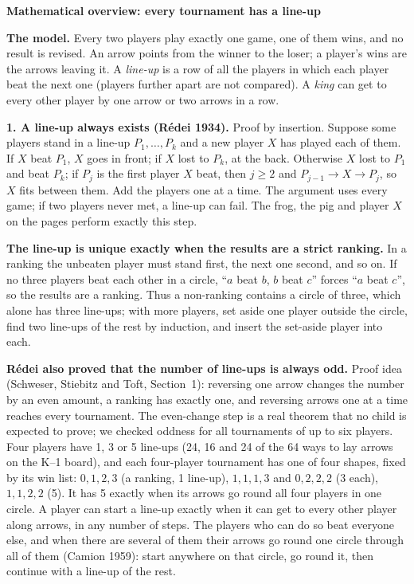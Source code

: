 \documentclass[11pt]{article}
\newcommand{\head}[1]{\par\needspace{6\baselineskip}\vspace{2pt}\textbf{\large #1}\par}
\begin{document}
\head{Mathematical overview: every tournament has a line-up}
\textbf{The model.} Every two players play exactly one game, one of them wins, and no result is revised. An arrow points from the winner to the loser; a player's wins are the arrows leaving it. A \emph{line-up} is a row of all the players in which each player beat the next one (players further apart are not compared). A \emph{king} can get to every other player by one arrow or two arrows in a row.

\textbf{1. A line-up always exists (R\'edei 1934).} Proof by insertion. Suppose some players stand in a line-up $P_1,\dots,P_k$ and a new player $X$ has played each of them. If $X$ beat $P_1$, $X$ goes in front; if $X$ lost to $P_k$, at the back. Otherwise $X$ lost to $P_1$ and beat $P_k$; if $P_j$ is the first player $X$ beat, then $j\ge2$ and $P_{j-1}\to X\to P_j$, so $X$ fits between them. Add the players one at a time. The argument uses every game; if two players never met, a line-up can fail. The frog, the pig and player $X$ on the pages perform exactly this step.

\textbf{The line-up is unique exactly when the results are a strict ranking.} In a ranking the unbeaten player must stand first, the next one second, and so on. If no three players beat each other in a circle, ``$a$ beat $b$, $b$ beat $c$'' forces ``$a$ beat $c$'', so the results are a ranking. Thus a non-ranking contains a circle of three, which alone has three line-ups; with more players, set aside one player outside the circle, find two line-ups of the rest by induction, and insert the set-aside player into each.

\textbf{R\'edei also proved that the number of line-ups is always odd.} Proof idea (Schweser, Stiebitz and Toft, Section~1): reversing one arrow changes the number by an even amount, a ranking has exactly one, and reversing arrows one at a time reaches every tournament. The even-change step is a real theorem that no child is expected to prove; we checked oddness for all tournaments of up to six players. Four players have 1, 3 or 5 line-ups (24, 16 and 24 of the 64 ways to lay arrows on the K--1 board), and each four-player tournament has one of four shapes, fixed by its win list: $0,1,2,3$ (a ranking, 1 line-up), $1,1,1,3$ and $0,2,2,2$ (3 each), $1,1,2,2$ (5). It has 5 exactly when its arrows go round all four players in one circle. A player can start a line-up exactly when it can get to every other player along arrows, in any number of steps. The players who can do so beat everyone else, and when there are several of them their arrows go round one circle through all of them (Camion 1959): start anywhere on that circle, go round it, then continue with a line-up of the rest.
\end{document}

